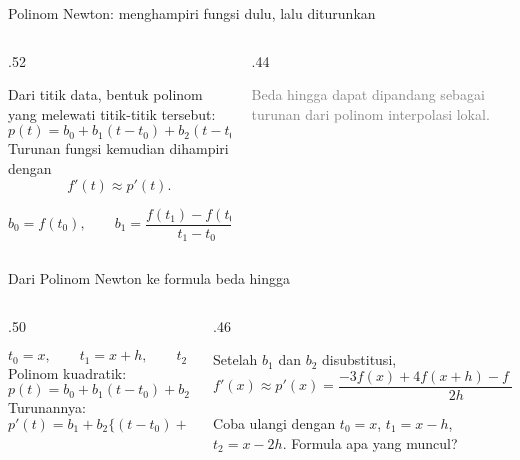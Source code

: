 \documentclass[aspectratio=169,10pt]{beamer}
\newcommand{\smallgray}[1]{\textcolor{GrayText}{\scriptsize #1}}
\begin{document}
\begin{frame}{Polinom Newton: menghampiri fungsi dulu, lalu diturunkan}
\scriptsize
\begin{columns}[T,totalwidth=\textwidth]
\begin{column}{.52\textwidth}
\begin{bluebox}
Dari titik data, bentuk polinom yang melewati titik-titik tersebut:
\[
p(t)=b_0+b_1(t-t_0)+b_2(t-t_0)(t-t_1)+\cdots.
\]
Turunan fungsi kemudian dihampiri dengan
\[
f'(t)\approx p'(t).
\]
\end{bluebox}
\begin{orangebox}
\[
b_0=f(t_0),\qquad
b_1=\frac{f(t_1)-f(t_0)}{t_1-t_0}.
\]
\end{orangebox}
\end{column}
\begin{column}{.44\textwidth}
\smallgray{Beda hingga dapat dipandang sebagai turunan dari polinom interpolasi lokal.}
\end{column}
\end{columns}
\end{frame}

\begin{frame}{Dari Polinom Newton ke formula beda hingga}
\scriptsize
\begin{columns}[T,totalwidth=\textwidth]
\begin{column}{.50\textwidth}
\begin{bluebox}
\[
t_0=x,
\qquad t_1=x+h,
\qquad t_2=x+2h.
\]
Polinom kuadratik:
\[
p(t)=b_0+b_1(t-t_0)+b_2(t-t_0)(t-t_1).
\]
Turunannya:
\[
p'(t)=b_1+b_2\{(t-t_0)+(t-t_1)\}.
\]
\end{bluebox}
\end{column}
\begin{column}{.46\textwidth}
\begin{orangebox}
Setelah $b_1$ dan $b_2$ disubstitusi,
\[
f'(x)\approx p'(x)
=\frac{-3f(x)+4f(x+h)-f(x+2h)}{2h}.
\]
\end{orangebox}
\begin{greenbox}
Coba ulangi dengan $t_0=x$, $t_1=x-h$, $t_2=x-2h$. Formula apa yang muncul?
\end{greenbox}
\end{column}
\end{columns}
\end{frame}
\end{document}
